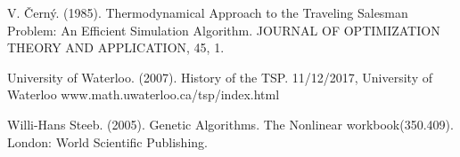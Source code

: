 \documentclass[twoside,twocolumn]{article}
\begin{document}
\begin{thebibliography}{99} %


V. Černý. (1985). 
\newblock Thermodynamical Approach to the Traveling Salesman Problem: An Efficient Simulation Algorithm. 
\newblock JOURNAL OF OPTIMIZATION THEORY AND APPLICATION, 45, 1.

University of Waterloo. (2007). 
\newblock History of the TSP. 11/12/2017, University of Waterloo
\newblock www.math.uwaterloo.ca/tsp/index.html

Willi-Hans Steeb. (2005). 
\newblock Genetic Algorithms. 
\newblock The Nonlinear workbook(350.409). London: World Scientific Publishing.

\end{thebibliography}

\end{document}
